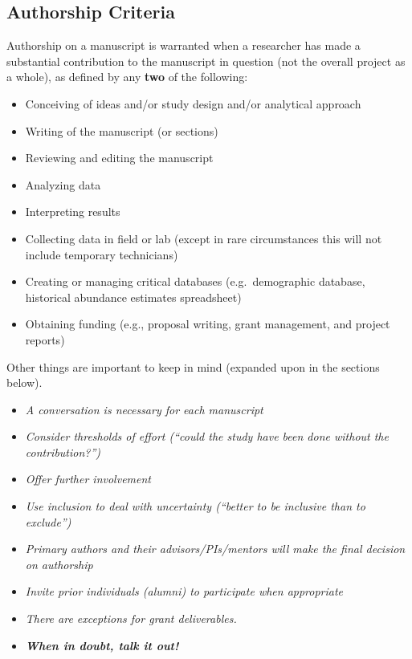 \documentclass[]{article}
\begin{document}
\hypertarget{authorship-criteria}{%
\subsection{\texorpdfstring{\textbf{Authorship
Criteria}}{Authorship Criteria}}\label{authorship-criteria}}

Authorship on a manuscript is warranted when a researcher has made a
substantial contribution to the manuscript in question (not the overall
project as a whole), as defined by any \textbf{two} of the following:

\begin{itemize}
\item
  Conceiving of ideas and/or study design and/or analytical approach
\item
  Writing of the manuscript (or sections)
\item
  Reviewing and editing the manuscript
\item
  Analyzing data
\item
  Interpreting results
\item
  Collecting data in field or lab (except in rare circumstances this
  will not include temporary technicians)
\item
  Creating or managing critical databases (e.g.~demographic database,
  historical abundance estimates spreadsheet)
\item
  Obtaining funding (e.g., proposal writing, grant management, and
  project reports)
\end{itemize}

Other things are important to keep in mind (expanded upon in the
sections below).

\begin{itemize}
\item
  \emph{A conversation is necessary for each manuscript}
\item
  \emph{Consider thresholds of effort (``could the study have been done
  without the contribution?'')}
\item
  \emph{Offer further involvement}
\item
  \emph{Use inclusion to deal with uncertainty (``better to be inclusive
  than to exclude'')}
\item
  \emph{Primary authors and their advisors/PIs/mentors will make the
  final decision on authorship}
\item
  \emph{Invite prior individuals (alumni) to participate when
  appropriate}
\item
  \emph{There are exceptions for grant deliverables.}
\item
  \textbf{\emph{When in doubt, talk it out!}}
\end{itemize}
\end{document}
